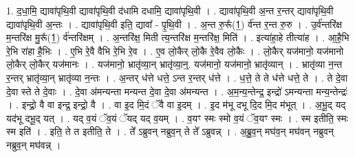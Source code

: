 \documentclass[17pt]{extarticle}
\begin{document}
1. द॒धा॒मि॒ द्यावा॑पृथि॒वी द्यावा॑पृथि॒वी द॑धामि दधामि॒ द्यावा॑पृथि॒वी । . द्यावा॑पृथि॒वी अ॒न्त र॒न्तर् द्यावा॑पृथि॒वी द्यावा॑पृथि॒वी अ॒न्तः । . द्यावा॑पृथि॒वी इति॒ द्यावा᳚ - पृ॒थि॒वी । . अ॒न्त रु॒रू᳚(1॒) र्व॑न्त र॒न्त रु॒रु । . उ॒र्व॑न्तरि॑क्ष म॒न्तरि॑क्ष मु॒रू᳚(1॒) र्व॑न्तरि॑क्षम् । . अ॒न्तरि॑क्ष॒ मिती त्य॒न्तरि॑क्ष म॒न्तरि॑क्ष॒ मिति॑ । . इत्या॑हा॒हे तीत्या॑ह । . आ॒है॒भि रे॒भि रा॑हा है॒भिः । . ए॒भि रे॒वै वैभि रे॒भि रे॒व । . ए॒व लो॒कैर् लो॒कै रे॒वैव लो॒कैः । . लो॒कैर् यज॑मानो॒ यज॑मानो लो॒कैर् लो॒कैर् यज॑मानः । . यज॑मानो॒ भ्रातृ॑व्या॒न् भ्रातृ॑व्या॒न्॒. यज॑मानो॒ यज॑मानो॒ भ्रातृ॑व्यान् । . भ्रातृ॑व्या न॒न्त र॒न्तर् भ्रातृ॑व्या॒न् भ्रातृ॑व्या न॒न्तः । . अ॒न्तर् ध॑त्ते धत्ते॒ ऽन्त र॒न्तर् ध॑त्ते । . ध॒त्ते॒ ते ते ध॑त्ते धत्ते॒ ते । . ते दे॒वा दे॒वा स्ते ते दे॒वाः । . दे॒वा अ॑मन्यन्ता मन्यन्त दे॒वा दे॒वा अ॑मन्यन्त । . अ॒म॒न्य॒न्तेन्द्र॒ इन्द्रो॑ ऽमन्यन्ता मन्य॒न्तेन्द्रः॑ । . इन्द्रो॒ वै वा इन्द्र॒ इन्द्रो॒ वै । . वा इ॒द मि॒दं ॅवै वा इ॒दम् । . इ॒द म॑भू दभू दि॒द मि॒द म॑भूत् । . अ॒भू॒द् यद् यद॑भू दभू॒द् यत् । . यद् व॒यं ॅव॒यं ॅयद् यद् व॒यम् । . व॒यꣳ स्मः स्मो व॒यं ॅव॒यꣳ स्मः । . स्म इतीति॒ स्मः स्म इति॑ । . इति॒ ते त इतीति॒ ते । . ते᳚ ऽब्रुवन् नब्रुव॒न् ते ते᳚ ऽब्रुवन्न् । . अ॒ब्रु॒व॒न् मघ॑व॒न् मघ॑वन् नब्रुवन् नब्रुव॒न् मघ॑वन्न् । \newline
\end{document}
